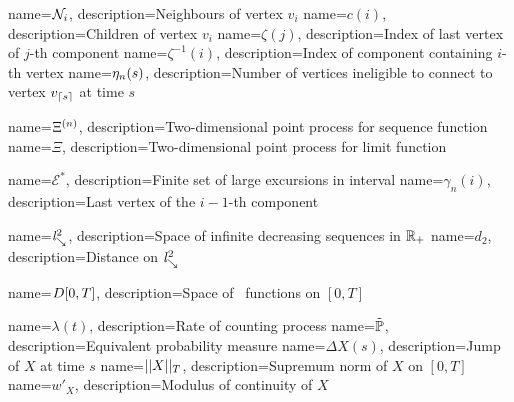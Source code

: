 {
	name={$\mathcal{N}_{i}$},
	description={Neighbours of vertex $v_i$}
}
{
name={$c(i)$},
description={Children of vertex $v_i$}
}
{
name={$\zeta(j)$},
description={Index of last vertex of $j$-th component}
}
{
name={$\zeta^{-1}(i)$},
description={Index of component containing $i$-th vertex}
}
{
	name={$\eta_n(s)$},
	description={Number of vertices ineligible to connect to vertex $v_{\lceil s\rceil}$ at time $s$}
}

{
	name={$\Xi^{(n)}$},
	description={Two-dimensional point process for sequence function}
}
{
name={$\Xi$},
description={Two-dimensional point process for limit function}
}

{
	name={$\mathcal{E}^*$},
	description={Finite set of large excursions in interval}
}
{
name={$\gamma_n(i)$},
description={Last vertex of the $i-1$-th component}
}


{
	name={$\mathit{l}^2_{\searrow}$},
	description={Space of infinite decreasing sequences in $\mathbb{R}_+$}
}
{
	name={$d_2$},
	description={Distance on $\mathit{l}^2_{\searrow}$}
}

{
name={$D[0, T]$},
description={Space of \cadlag~functions on $[0,T]$}
}

{
name={$\lambda(t)$},
description={Rate of counting process}
}
{
name={$\tilde{\mathbb{P}}$},
description={Equivalent probability measure}
}
{
name={$\Delta X(s)$},
description={Jump of $X$ at time $s$}
}
{
name={$||X||_T$},
description={Supremum norm of $X$ on $[0,T]$}
}
{
	name={$w'_X$},
	description={Modulus of continuity of $X$}
}

